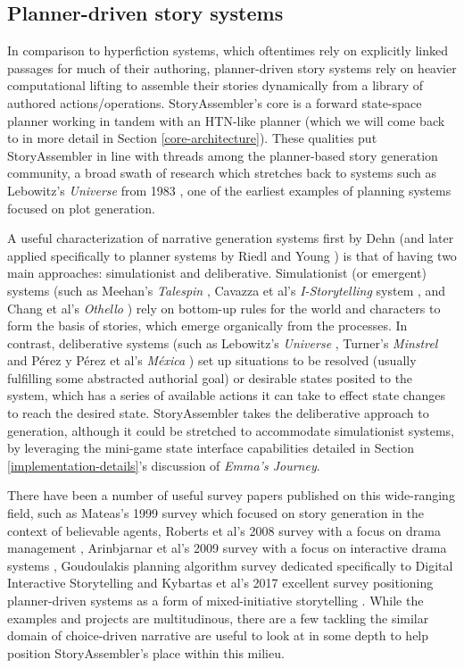 \subsection{Planner-driven story systems}
\label{sec:sa-planner-refs}

In comparison to hyperfiction systems, which oftentimes rely on explicitly linked passages for much of their authoring, planner-driven story systems rely on heavier computational lifting to assemble their stories dynamically from a library of authored actions/operations. StoryAssembler's core is a forward state-space planner working in tandem with an HTN-like planner (which we will come back to in more detail in Section \ref{core-architecture}). These qualities put StoryAssembler in line with threads among the planner-based story generation community, a broad swath of research which stretches back to systems such as Lebowitz's \textit{Universe} from 1983 \cite{universe}, one of the earliest examples of planning systems focused on plot generation. 

A useful characterization of narrative generation systems first by Dehn \cite{dehn} (and later applied specifically to planner systems by Riedl and Young \cite{planningRiedl}) is that of having two main approaches: simulationist and deliberative. Simulationist (or emergent) systems (such as Meehan's \textit{Talespin} \cite{meehan1977tale}, Cavazza et al's \textit{I-Storytelling} system \cite{cavazza2002interacting}, and Chang et al's \textit{Othello} \cite{chang2009planning}) rely on bottom-up rules for the world and characters to form the basis of stories, which emerge organically from the processes. In contrast, deliberative systems (such as Lebowitz's \textit{Universe} \cite{universe}, Turner's \textit{Minstrel} \cite{minstrel} and Pérez y Pérez et al's \textit{Méxica} \cite{perez2001mexica}) set up situations to be resolved (usually fulfilling some abstracted authorial goal) or desirable states posited to the system, which has a series of available actions it can take to effect state changes to reach the desired state. StoryAssembler takes the deliberative approach to generation, although it could be stretched to accommodate simulationist systems, by leveraging the mini-game state interface capabilities detailed in Section \ref{implementation-details}'s discussion of \textit{Emma's Journey}.

There have been a number of useful survey papers published on this wide-ranging field, such as Mateas's 1999 survey \cite{mateas1999oz} which focused on story generation in the context of believable agents, Roberts et al's 2008 survey with a focus on drama management \cite{roberts2008survey}, Arinbjarnar et al's 2009 survey with a focus on interactive drama systems \cite{arinbjarnar2009critical}, Goudoulakis planning algorithm survey dedicated specifically to Digital Interactive Storytelling \cite{goudoulakis_2011_survey} and Kybartas et al's 2017 excellent survey positioning planner-driven systems as a form of mixed-initiative storytelling \cite{kybartas_2017}. While the examples and projects are multitudinous, there are a few tackling the similar domain of choice-driven narrative are useful to look at in some depth to help position StoryAssembler's place within this milieu.

